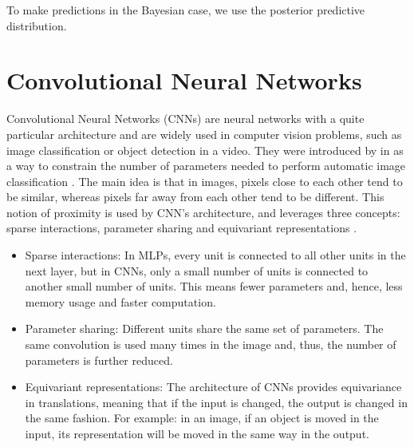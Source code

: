 To make predictions in the Bayesian case, we use the posterior predictive distribution.



\section{Convolutional Neural Networks}

Convolutional Neural Networks (CNNs) are neural networks with a quite particular architecture and are widely used in computer vision problems, such as image classification or object detection in a video. They were introduced by \citeauthor{lecun1989generalization} in \citeyear{lecun1989generalization} as a way to constrain the number of parameters needed to perform automatic image classification \cite{lecun1989generalization}. The main idea is that in images, pixels close to each other tend to be similar, whereas pixels far away from each other tend to be different. This notion of proximity is used by CNN's architecture, and leverages three concepts: sparse interactions, parameter sharing and equivariant representations \cite[p.~335]{bengio2015deep}.

\begin{itemize}
  \item Sparse interactions: In MLPs, every unit is connected to all other units in the next layer, but in CNNs, only a small number of units is connected to another small number of units. This means fewer parameters and, hence, less memory usage and faster computation.
  \item Parameter sharing: Different units share the same set of parameters. The same convolution is used many times in the image and, thus, the number of parameters is further reduced.
  \item Equivariant representations: The architecture of CNNs provides equivariance in translations, meaning that if the input is changed, the output is changed in the same fashion. For example: in an image, if an object is moved in the input, its representation will be moved in the same way in the output.
\end{itemize}


